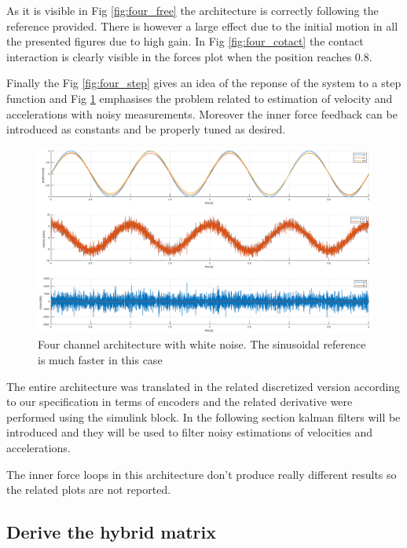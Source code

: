 \documentclass[a4paper,12pt]{article}
\begin{document}
As it is visible in Fig \ref{fig:four_free} the architecture is correctly following the reference provided. There is however a large effect due to the initial motion in all the presented figures due to high gain. In Fig \ref{fig:four_cotact} the contact interaction is clearly visible in the forces plot when the position reaches 0.8. 

Finally the Fig \ref{fig:four_step} gives an idea of the reponse of the system to a step function and Fig \ref{fig:four_noisy} emphasises the problem related to estimation of velocity and accelerations with noisy measurements. Moreover the inner force feedback can be introduced as constants and be properly tuned as desired.

\begin{figure}[H]
    \begin{center}
        \hspace*{-4.2cm}
        \includegraphics[scale=0.4]{images/four_noisy.eps}
    \end{center}
    \caption{Four channel architecture with white noise. The sinusoidal reference is much faster in this case}
    \label{fig:four_noisy}
\end{figure}

\noindent The entire architecture was translated in the related discretized version according to our specification in terms of encoders and the related derivative were performed using the simulink block. In the following section kalman filters will be introduced and they will be used to filter noisy estimations of velocities and accelerations.

\bigskip
\noindent The inner force loops in this architecture don't produce really different results so the related plots are not reported. 

\subsection{Derive the hybrid matrix}
\end{document}
